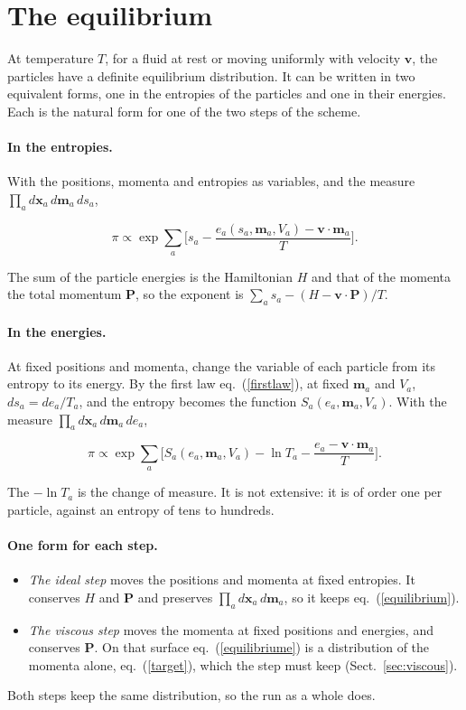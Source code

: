 \documentclass[11pt,aps,preprint,nofootinbib,superscriptaddress,tightenlines]{revtex4-2}
\def\st{\begin{equation}}
\def\stp{\end{equation}}
\def\Eq#1{eq.~(\ref{#1})}
\def\Sect#1{Sect.~\ref{#1}}
\let\oldparagraph\paragraph
\renewcommand{\paragraph}{\par\bigskip\oldparagraph}
\begin{document}
\section{The equilibrium}
\label{sec:equilibrium}

At temperature $T$, for a fluid at rest or moving uniformly with velocity $\bm v$, the particles have a definite equilibrium distribution.  It can be
written in two equivalent forms, one in the entropies of the particles and one in their energies.  Each is the natural form for one of the
two steps of the scheme.

\paragraph{In the entropies.}  With the positions, momenta and entropies as variables, and the measure $\prod_ad\bm x_a\,d\bm m_a\,ds_a$,
\begin{keyeq}
\st
\pi\propto\exp\sum_a\Big[s_a-\frac{e_a(s_a,\bm m_a,V_a)-\bm v\cdot\bm m_a}{T}\Big] .
\label{equilibrium}
\stp
\end{keyeq}
The sum of the particle energies is the Hamiltonian $H$ and that of the momenta the total momentum $\bm P$, so the exponent is
$\sum_as_a-(H-\bm v\cdot\bm P)/T$.

\paragraph{In the energies.}  At fixed positions and momenta, change the variable of each particle from its entropy to its energy.  By the first
law \Eq{firstlaw}, at fixed $\bm m_a$ and $V_a$, $ds_a=de_a/T_a$, and the entropy becomes the function $S_a(e_a,\bm m_a,V_a)$.  With the
measure $\prod_ad\bm x_a\,d\bm m_a\,de_a$,
\begin{keyeq}
\st
\pi\propto\exp\sum_a\Big[S_a(e_a,\bm m_a,V_a)-\ln T_a-\frac{e_a-\bm v\cdot\bm m_a}{T}\Big] .
\label{equilibriume}
\stp
\end{keyeq}
The $-\ln T_a$ is the change of measure.  It is not extensive: it is of order one per particle, against an entropy of tens to hundreds.

\paragraph{One form for each step.}
\begin{itemize}
\item \emph{The ideal step} moves the positions and momenta at fixed entropies.  It conserves $H$ and $\bm P$ and preserves $\prod_ad\bm x_a\,d\bm m_a$, so it
  keeps \Eq{equilibrium}.
\item \emph{The viscous step} moves the momenta at fixed positions and energies, and conserves $\bm P$.  On that surface \Eq{equilibriume} is a
  distribution of the momenta alone, \Eq{target}, which the step must keep (\Sect{sec:viscous}).
\end{itemize}
Both steps keep the same distribution, so the run as a whole does.
\end{document}

